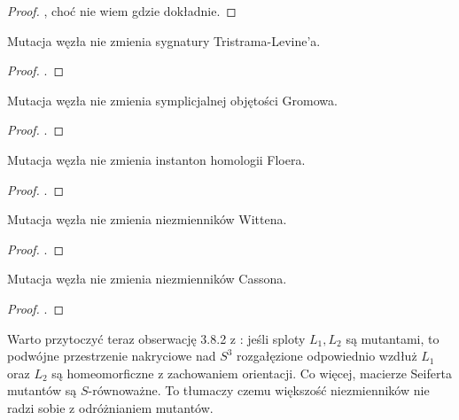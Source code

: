 \begin{proof}
    \cite{tanaka09}, choć nie wiem gdzie dokładnie.
\end{proof}

\begin{proposition}
    Mutacja węzła nie zmienia sygnatury Tristrama-Levine'a.
\end{proposition}

\begin{proof}
    \cite{cooper99}.
\end{proof}

\begin{proposition}
    Mutacja węzła nie zmienia symplicjalnej objętości Gromowa.
\end{proposition}

\begin{proof}
    \cite{ruberman87}.
\end{proof}

\begin{proposition}
    Mutacja węzła nie zmienia instanton homologii Floera.
\end{proposition}

\begin{proof}
    \cite{ruberman99}.
\end{proof}

\begin{proposition}
    Mutacja węzła nie zmienia niezmienników Wittena.
\end{proposition}

\begin{proof}
    \cite{rong94}.
\end{proof}

\begin{proposition}
    Mutacja węzła nie zmienia niezmienników Cassona.
\end{proposition}

\begin{proof}
    \cite{kirk89}.
\end{proof}

Warto przytoczyć teraz obserwację 3.8.2 z \cite[s. 43]{kawauchi96}: jeśli sploty $L_1, L_2$ są mutantami, to podwójne przestrzenie nakryciowe nad $S^3$ rozgałęzione odpowiednio wzdłuż $L_1$ oraz $L_2$ są homeomorficzne z zachowaniem orientacji.
Co więcej, macierze Seiferta mutantów są $S$-równoważne.
To tłumaczy czemu większość niezmienników nie radzi sobie z odróżnianiem mutantów.

